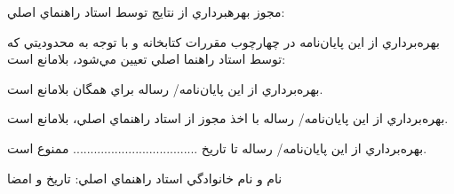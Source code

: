 \noindent مجوز بهرهبرداري از نتايج توسط استاد راهنماي اصلي:\par بهره‌برداري از اين پايان‌نامه در چهارچوب مقررات كتابخانه و با توجه به محدوديتي كه توسط استاد راهنما اصلي تعيين مي‌شود، بلامانع است:\par  بهره‌برداري از اين پايان‌نامه/ رساله براي همگان بلامانع است.\par  بهره‌برداري از اين پايان‌نامه/ رساله با اخذ مجوز از استاد راهنماي اصلي، بلامانع است.\par  بهره‌برداري از اين پايان‌نامه/ رساله تا تاريخ .................................... ممنوع است. \par نام و نام خانوادگي استاد راهنماي اصلي:                                                          تاريخ و امضا\par\smallskip
\endgroup